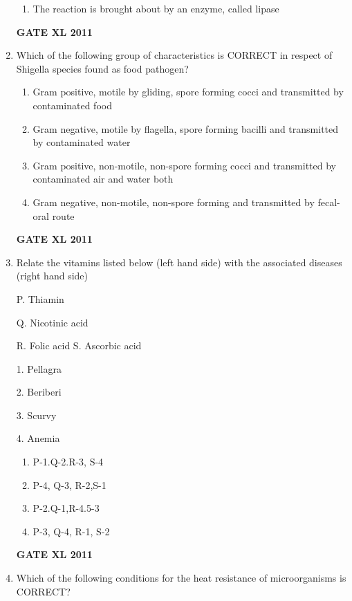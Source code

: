 \documentclass[journal,12pt,onecolumn]{IEEEtran}
\begin{document}
\begin{enumerate}
\begin{enumerate}
	\item The reaction is brought about by an enzyme, called lipase
\end{enumerate}
\hfill{\textbf{GATE XL 2011}}
	\item{ Which of the following group of characteristics is CORRECT in respect of Shigella species found as food pathogen?}
\begin{enumerate}
	\item Gram positive, motile by gliding, spore forming cocci and transmitted by contaminated food
	\item Gram negative, motile by flagella, spore forming bacilli and transmitted by contaminated water
	\item Gram positive, non-motile, non-spore forming cocci and transmitted by contaminated air and water both
	\item Gram negative, non-motile, non-spore forming and transmitted by fecal-oral route
\end{enumerate}
\hfill{\textbf{GATE XL 2011}}
	\item {Relate the vitamins listed below (left hand side) with the associated diseases (right hand side)}
		\newline
\begin{minipage}{0.5\textwidth}
	\begin{flushleft}

P. Thiamin

Q. Nicotinic acid

R. Folic acid
S. Ascorbic acid
		\end{flushleft}
		\end{minipage}
	\begin{minipage}{0.5\textwidth}
		\begin{flushleft}
1. Pellagra

2. Beriberi

3. Scurvy

4. Anemia
		\end{flushleft}
		\end{minipage}

\begin{enumerate}
	\item P-1.Q-2.R-3, S-4
	\item P-4, Q-3, R-2,S-1
	\item P-2.Q-1,R-4.5-3
	\item P-3, Q-4, R-1, S-2
\end{enumerate}
\hfill{\textbf{GATE XL 2011}}

\item{ Which of the following conditions for the heat resistance of microorganisms is CORRECT?}


\end{enumerate}
\end{document}
